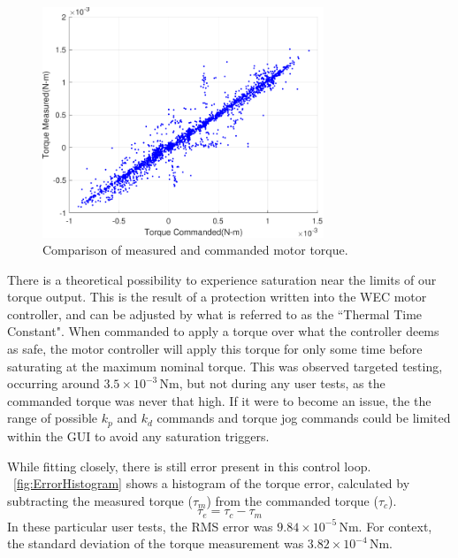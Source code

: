 \documentclass[hardware,article,submit,pdftex,moreauthors]{Definitions/mdpi}
\begin{document}
\begin{figure}[tb]
  \centering
  \includegraphics[width=0.75\textwidth]{diagrams/TorqueCommanded.pdf}
  \caption{Comparison of measured and commanded motor torque.}
  \label{fig:TorqueCommanded}
\end{figure}

There is a theoretical possibility to experience saturation near the limits of our torque output.
This is the result of a protection written into the WEC motor controller, and can be adjusted by what is referred to as the ``Thermal Time Constant".
When commanded to apply a torque over what the controller deems as safe, the motor controller will apply this torque for only some time before saturating at the maximum nominal torque.
This was observed targeted testing, occurring around $3.5\times 10^{-3}$\,Nm, but not during any user tests, as the commanded torque was never that high.
If it were to become an issue, the the range of possible $k_p$ and $k_d$ commands and torque jog commands could be limited within the GUI to avoid any saturation triggers.

While fitting closely, there is still error present in this control loop. 
\figurename~\ref{fig:ErrorHistogram} shows a histogram of the torque error, calculated by subtracting the measured torque ($\tau_m$) from the commanded torque ($\tau_c$).
%
\begin{equation}
	\tau_e = \tau_c - \tau_m
	\label{eq:torque_error}
\end{equation}
%
In these particular user tests, the RMS error was $9.84 \times 10^{-5}$\,Nm.
For context, the standard deviation of the torque measurement was $3.82\times 10^{-4}$\,Nm.
\end{document}
